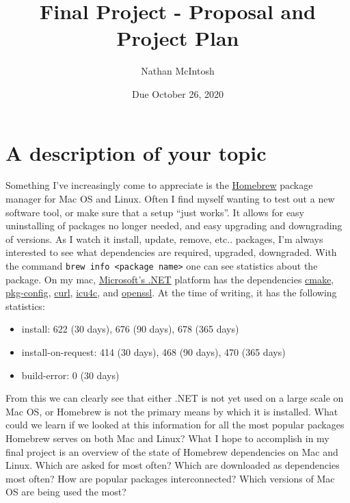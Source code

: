 \documentclass{article}
\title{Final Project - Proposal and Project Plan}
\author{Nathan McIntosh}
\date{Due October 26, 2020}
\begin{document}
\maketitle

\section{A description of your topic}
Something I've increasingly come to appreciate is the \href{https://brew.sh/}{Homebrew} package manager for Mac OS and Linux. Often I find myself wanting to test out a new software tool, or make sure that a setup ``just works''. It allows for easy uninstalling of packages no longer needed, and easy upgrading and downgrading of versions. As I watch it install, update, remove, etc.. packages, I'm always interested to see what dependencies are required, upgraded, downgraded. With the command \texttt{brew info <package name>} one can see statistics about the package. On my mac, \href{https://dotnet.microsoft.com/}{Microsoft's .NET} platform has the dependencies \href{https://cmake.org/}{cmake}, \href{https://www.freedesktop.org/wiki/Software/pkg-config/}{pkg-config}, \href{https://curl.haxx.se/}{curl}, \href{http://site.icu-project.org/}{icu4c}, and \href{https://www.openssl.org/}{openssl}. At the time of writing, it has the following statistics:
\begin{itemize}
    \item install: 622 (30 days), 676 (90 days), 678 (365 days)
    \item install-on-request: 414 (30 days), 468 (90 days), 470 (365 days)
    \item build-error: 0 (30 days)
\end{itemize}
From this we can clearly see that either .NET is not yet used on a large scale on Mac OS, or Homebrew is not the primary means by which it is installed. What could we learn if we looked at this information for all the most popular packages Homebrew serves on both Mac and Linux? What I hope to accomplish in my final project is an overview of the state of Homebrew dependencies on Mac and Linux. Which are asked for most often? Which are downloaded as dependencies most often? How are popular packages interconnected? Which versions of Mac OS are being used the most?
\end{document}
